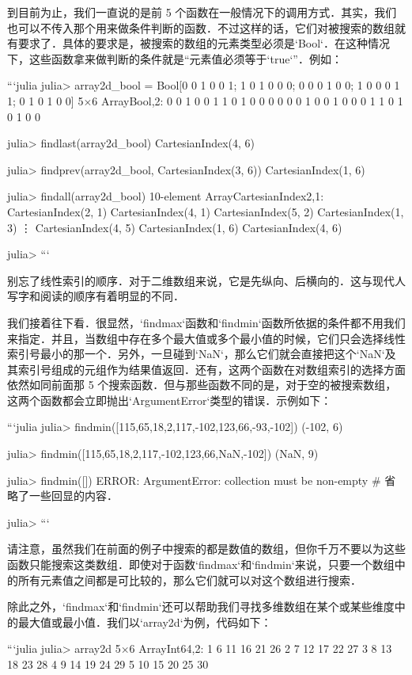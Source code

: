 到目前为止，我们一直说的是前 5 个函数在一般情况下的调用方式．其实，我们也可以不传入那个用来做条件判断的函数．不过这样的话，它们对被搜索的数组就有要求了．具体的要求是，被搜索的数组的元素类型必须是`Bool`．在这种情况下，这些函数拿来做判断的条件就是“元素值必须等于`true`”．例如：

```julia
julia> array2d_bool = Bool[0 0 1 0 0 1; 1 0 1 0 0 0; 0 0 0 1 0 0; 1 0 0 0 1 1; 0 1 0 1 0 0]
5×6 Array{Bool,2}:
 0  0  1  0  0  1
 1  0  1  0  0  0
 0  0  0  1  0  0
 1  0  0  0  1  1
 0  1  0  1  0  0

julia> findlast(array2d_bool)
CartesianIndex(4, 6)

julia> findprev(array2d_bool, CartesianIndex(3, 6))
CartesianIndex(1, 6)

julia> findall(array2d_bool)
10-element Array{CartesianIndex{2},1}:
 CartesianIndex(2, 1)
 CartesianIndex(4, 1)
 CartesianIndex(5, 2)
 CartesianIndex(1, 3)
 ⋮                   
 CartesianIndex(4, 5)
 CartesianIndex(1, 6)
 CartesianIndex(4, 6)

julia> 
```

别忘了线性索引的顺序．对于二维数组来说，它是先纵向、后横向的．这与现代人写字和阅读的顺序有着明显的不同．

我们接着往下看．很显然，`findmax`函数和`findmin`函数所依据的条件都不用我们来指定．并且，当数组中存在多个最大值或多个最小值的时候，它们只会选择线性索引号最小的那一个．另外，一旦碰到`NaN`，那么它们就会直接把这个`NaN`及其索引号组成的元组作为结果值返回．还有，这两个函数在对数组索引的选择方面依然如同前面那 5 个搜索函数．但与那些函数不同的是，对于空的被搜索数组，这两个函数都会立即抛出`ArgumentError`类型的错误．示例如下：

```julia
julia> findmin([115,65,18,2,117,-102,123,66,-93,-102])
(-102, 6)

julia> findmin([115,65,18,2,117,-102,123,66,NaN,-102])
(NaN, 9)

julia> findmin([])
ERROR: ArgumentError: collection must be non-empty
# 省略了一些回显的内容．

julia> 
```

请注意，虽然我们在前面的例子中搜索的都是数值的数组，但你千万不要以为这些函数只能搜索这类数组．即使对于函数`findmax`和`findmin`来说，只要一个数组中的所有元素值之间都是可比较的，那么它们就可以对这个数组进行搜索．

除此之外，`findmax`和`findmin`还可以帮助我们寻找多维数组在某个或某些维度中的最大值或最小值．我们以`array2d`为例，代码如下：

```julia
julia> array2d
5×6 Array{Int64,2}:
 1   6  11  16  21  26
 2   7  12  17  22  27
 3   8  13  18  23  28
 4   9  14  19  24  29
 5  10  15  20  25  30

